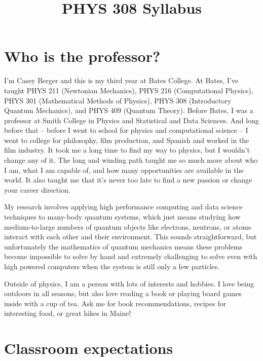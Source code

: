 \documentclass[
  letterpaper,
  DIV=11,
  numbers=noendperiod]{scrartcl}
\title{PHYS 308 Syllabus}
\author{}
\date{}
\renewcommand*\contentsname{Table of contents}
\newcommand\contentsname{Table of contents}
\begin{document}
\maketitle

\renewcommand*\contentsname{Table of contents}
{
\setcounter{tocdepth}{3}
\tableofcontents
}

\section{Who is the professor?}\label{who-is-the-professor}

I'm Casey Berger and this is my third year at Bates College. At Bates,
I've taught PHYS 211 (Newtonian Mechanics), PHYS 216 (Computational
Physics), PHYS 301 (Mathematical Methods of Physics), PHYS 308
(Introductory Quantum Mechanics), and PHYS 409 (Quantum Theory). Before
Bates, I was a professor at Smith College in Physics and Statistical and
Data Sciences. And long before that -- before I went to school for
physics and computational science -- I went to college for philosophy,
film production, and Spanish and worked in the film industry. It took me
a long time to find my way to physics, but I wouldn't change any of it.
The long and winding path taught me so much more about who I am, what I
am capable of, and how many opportunities are available in the world. It
also taught me that it's never too late to find a new passion or change
your career direction.

My research involves applying high performance computing and data
science techniques to many-body quantum systems, which just means
studying how medium-to-large numbers of quantum objects like electrons,
neutrons, or atoms interact with each other and their environment. This
sounds straightforward, but unfortunately the mathematics of quantum
mechanics means these problems become impossible to solve by hand and
extremely challenging to solve even with high powered computers when the
system is still only a few particles.

Outside of physics, I am a person with lots of interests and hobbies. I
love being outdoors in all seasons, but also love reading a book or
playing board games inside with a cup of tea. Ask me for book
recommendations, recipes for interesting food, or great hikes in Maine!

\section{Classroom expectations}\label{classexpectations}
\end{document}
